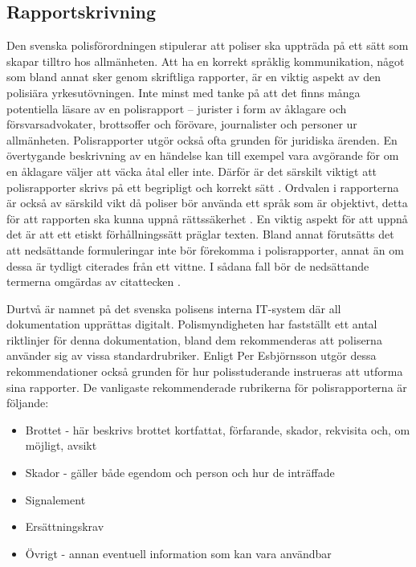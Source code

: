 \documentclass[swedish]{maucsthesis}
\begin{document}
\subsection{Rapportskrivning}

Den svenska polisförordningen stipulerar att poliser ska uppträda på ett sätt
som skapar tilltro hos allmänheten. Att ha en korrekt språklig kommunikation,
något som bland annat sker genom skriftliga rapporter, är en viktig aspekt av
den polisiära yrkesutövningen. Inte minst med tanke på att det finns många
potentiella läsare av en polisrapport – jurister i form av åklagare och
försvarsadvokater, brottsoffer och förövare, journalister och personer ur
allmänheten. Polisrapporter utgör också ofta grunden för juridiska ärenden. En
övertygande beskrivning av en händelse kan till exempel vara avgörande för om en
åklagare väljer att väcka åtal eller inte. Därför är det särskilt viktigt att
polisrapporter skrivs på ett begripligt och korrekt sätt \cite{ask:2013}.
Ordvalen i rapporterna är också av särskild vikt då poliser bör använda ett
språk som är objektivt, detta för att rapporten ska kunna uppnå rättssäkerhet
\citep{ask:2018}. En viktig aspekt för att uppnå det är att ett etiskt
förhållningssätt präglar texten. Bland annat förutsätts det att nedsättande
formuleringar inte bör förekomma i polisrapporter, annat än om dessa är tydligt
citerades från ett vittne. I sådana fall bör de nedsättande termerna omgärdas av
citattecken \cite{ask:2013}.

Durtvå är namnet på det svenska polisens interna IT-system där all dokumentation
upprättas digitalt. Polismyndigheten har fastställt ett antal riktlinjer för
denna dokumentation, bland dem rekommenderas att poliserna använder sig av vissa
standardrubriker. Enligt Per Esbjörnsson utgör dessa rekommendationer också
grunden för hur polisstuderande instrueras att utforma sina rapporter. De
vanligaste rekommenderade rubrikerna för polisrapporterna är följande:

\begin{itemize}
\item Brottet - här beskrivs brottet kortfattat, förfarande, skador, rekvisita
  och, om möjligt, avsikt
\item Skador - gäller både egendom och person och hur de inträffade
\item Signalement
\item Ersättningskrav
\item Övrigt - annan eventuell information som kan vara användbar
\end{itemize}
\end{document}
